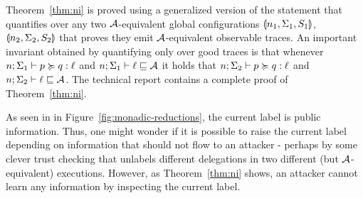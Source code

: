 Theorem~\ref{thm:ni} is proved using a generalized version of the statement that quantifies over any two $\mathcal{A}$-equivalent global configurations $\llparenthesis n_1, \Sigma_1, S_1 \rrparenthesis$, $\llparenthesis n_2, \Sigma_2, S_2 \rrparenthesis$ that proves they emit $\mathcal{A}$-equivalent observable traces. An important invariant obtained by quantifying only over good traces is that whenever $n; \Sigma_1 \vdash p \succcurlyeq q : \ell$ and $n; \Sigma_1 \vdash \ell \sqsubseteq \mathcal{A}$ it holds that $n; \Sigma_2 \vdash p \succcurlyeq q : \ell$ and $n; \Sigma_2 \vdash \ell \sqsubseteq \mathcal{A}$. The technical report \cite{techreport} contains a complete proof of Theorem~\ref{thm:ni}.

As seen in  in Figure~\ref{fig:monadic-reductions}, the current label is public information. Thus, one might wonder if it is possible to raise the current label depending on information that should not flow to an attacker - perhaps by some clever trust checking that unlabels different delegations in two different (but $\mathcal{A}$-equivalent) executions. However, as Theorem~\ref{thm:ni} shows, an attacker cannot learn any information by inspecting the current label.